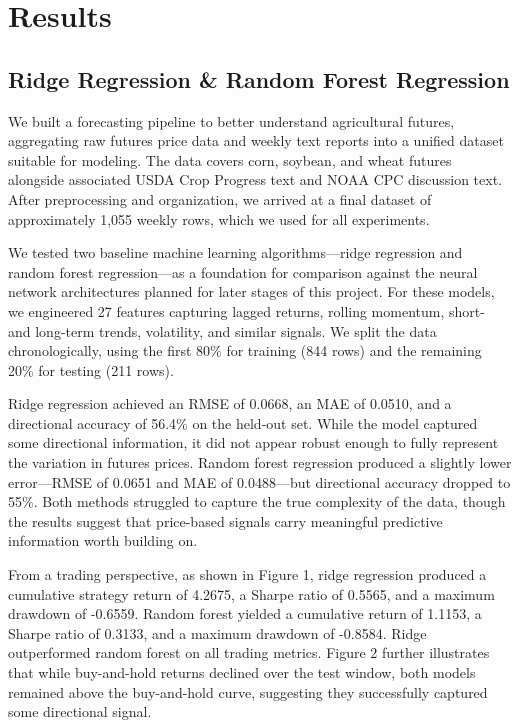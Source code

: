 \documentclass{article} %
\begin{document}
\section{Results}
\subsection{Ridge Regression \& Random Forest Regression}
We built a forecasting pipeline to better understand agricultural futures, aggregating raw futures price data and weekly text reports into a unified dataset suitable for modeling. The data covers corn, soybean, and wheat futures alongside associated USDA Crop Progress text and NOAA CPC discussion text. After preprocessing and organization, we arrived at a final dataset of approximately 1,055 weekly rows, which we used for all experiments.

We tested two baseline machine learning algorithms—ridge regression and random forest regression—as a foundation for comparison against the neural network architectures planned for later stages of this project. For these models, we engineered 27 features capturing lagged returns, rolling momentum, short- and long-term trends, volatility, and similar signals. We split the data chronologically, using the first 80\% for training (844 rows) and the remaining 20\% for testing (211 rows).

Ridge regression achieved an RMSE of 0.0668, an MAE of 0.0510, and a directional accuracy of 56.4\% on the held-out set. While the model captured some directional information, it did not appear robust enough to fully represent the variation in futures prices. Random forest regression produced a slightly lower error—RMSE of 0.0651 and MAE of 0.0488—but directional accuracy dropped to 55\%. Both methods struggled to capture the true complexity of the data, though the results suggest that price-based signals carry meaningful predictive information worth building on.

From a trading perspective, as shown in Figure 1, ridge regression produced a cumulative strategy return of 4.2675, a Sharpe ratio of 0.5565, and a maximum drawdown of -0.6559. Random forest yielded a cumulative return of 1.1153, a Sharpe ratio of 0.3133, and a maximum drawdown of -0.8584. Ridge outperformed random forest on all trading metrics. Figure 2 further illustrates that while buy-and-hold returns declined over the test window, both models remained above the buy-and-hold curve, suggesting they successfully captured some directional signal.
\end{document}
